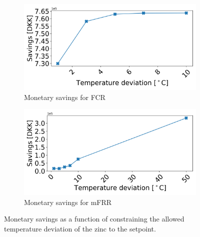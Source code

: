 \documentclass[conference]{IEEEtran}
\begin{document}
\begin{figure}[t]
    \centering
    \begin{subfigure}{0.49\columnwidth}
        \centering
        \includegraphics[width=0.98\columnwidth]{../figures/profit_vs_delta_temp_fcr.png}
        \caption{Monetary savings for FCR}
        \label{subfig:profit_vs_delta_temp_fcr}
    \end{subfigure}
    \begin{subfigure}{0.49\columnwidth}
        \centering
        \includegraphics[width=0.98\columnwidth]{../figures/profit_vs_delta_temp_mfrr_and_energy.png}
        \caption{Monetary savings for mFRR}
        \label{subfig:profit_vs_delta_temp_mfrr}
    \end{subfigure}
    \caption{\small{Monetary savings as a function of constraining the allowed temperature deviation of the zinc to the setpoint. \vspace{-3mm}}}
    \label{fig:profit_vs_delta_temp}
\end{figure}

\vspace{1mm}
\end{document}
